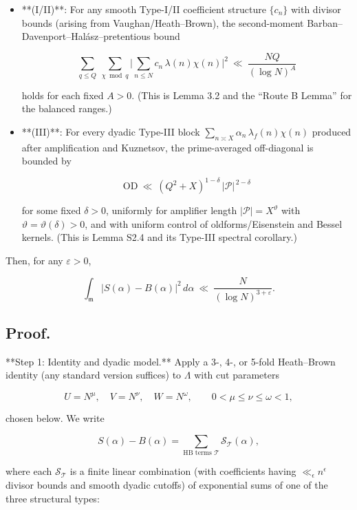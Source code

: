 \documentclass[11pt]{article}
\theoremstyle{definition}
\theoremstyle{remark}
\begin{document}
\begin{itemize}
\item **(I/II)**: For any smooth Type-I/II coefficient structure $\{c_n\}$ with divisor bounds (arising from Vaughan/Heath–Brown), the second-moment Barban–Davenport–Halász–pretentious bound

\begin{equation}
\sum_{q\le Q}\ \sum_{\chi\bmod q}\Big|\sum_{n\le N} c_n\,\lambda(n)\chi(n)\Big|^2
\ \ll\ \frac{NQ}{(\log N)^A}
\tag{D.1}
\end{equation}

holds for each fixed $A>0$. (This is Lemma 3.2 and the “Route B Lemma” for the balanced ranges.)

\item **(III)**: For every dyadic Type-III block $\sum_{n\asymp X}\alpha_n\,\lambda_f(n)\chi(n)$ produced after amplification and Kuznetsov, the prime-averaged off-diagonal is bounded by

\begin{equation}
\mathrm{OD}\ \ll\ (Q^2+X)^{1-\delta}\,|\mathcal P|^{\,2-\delta}
\tag{D.2}
\end{equation}

for some fixed $\delta>0$, uniformly for amplifier length $|\mathcal P|=X^\vartheta$ with $\vartheta=\vartheta(\delta)>0$, and with uniform control of oldforms/Eisenstein and Bessel kernels. (This is Lemma S2.4 and its Type-III spectral corollary.)
\end{itemize}

Then, for any $\varepsilon>0$,

$$
\int_{\mathfrak m}\big|S(\alpha)-B(\alpha)\big|^2\,d\alpha
\ \ll\ \frac{N}{(\log N)^{3+\varepsilon}}.
$$

\subsection*{Proof.}

**Step 1: Identity and dyadic model.**
Apply a 3-, 4-, or 5-fold Heath–Brown identity (any standard version suffices) to $\Lambda$ with cut parameters

$$
U=N^{\mu},\quad V=N^{\nu},\quad W=N^{\omega},\qquad 0<\mu\le\nu\le\omega<1,
$$

chosen below. We write

$$
S(\alpha)-B(\alpha)
=\sum_{\text{HB terms }\mathcal T} \mathcal S_{\mathcal T}(\alpha),
$$

where each $\mathcal S_{\mathcal T}$ is a finite linear combination (with coefficients having $\ll_\epsilon n^\epsilon$ divisor bounds and smooth dyadic cutoffs) of exponential sums of one of the three structural types:
\end{document}
